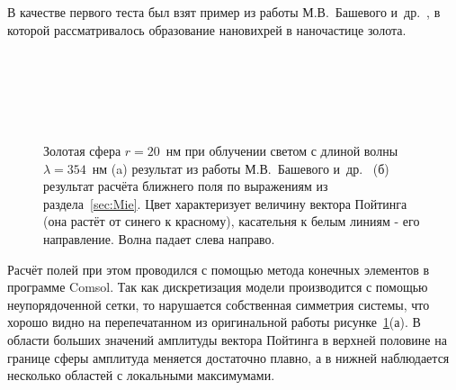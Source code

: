 В качестве первого теста был взят пример из работы
М.В.~Башевого и~др.~\cite{Bashevoy-2005}, в которой рассматривалось
образование нановихрей в наночастице золота.
\begin{figure}[p]  %
  \begin{minipage}[ht]{0.99\linewidth}        
  \end{minipage}\\
  \vfill
  \begin{minipage}[ht]{0.99\linewidth}        
  \end{minipage}\\
  \vfill
  \begin{minipage}[ht]{0.99\linewidth}
  \end{minipage}\\
  \begin{minipage}[ht]{0.99\linewidth}
  \end{minipage}
  \caption{Золотая сфера $r=20$~нм при облучении светом с длиной волны
    $\lambda=354$~нм (a) результат из работы М.В.~Башевого
    и~др.~\cite{Bashevoy-2005} (б) результат расчёта ближнего поля по
    выражениям из раздела~\ref{sec:Mie}. Цвет характеризует величину
    вектора Пойтинга (она растёт от синего к красному),
    касательня к белым линиям - его направление. Волна падает слева
    направо.\label{img:vortex}}
\end{figure}
Расчёт полей при этом проводился с помощью метода конечных элементов в
программе Comsol. Так как дискретизация модели производится с помощью
неупорядоченной сетки, то нарушается собственная симметрия системы,
что хорошо видно на перепечатанном из оригинальной работы
рисунке~\ref{img:vortex}(а).  В области больших значений амплитуды
вектора Пойтинга в верхней половине на границе сферы амплитуда
меняется достаточно плавно, а в нижней наблюдается несколько областей
с локальными максимумами.

